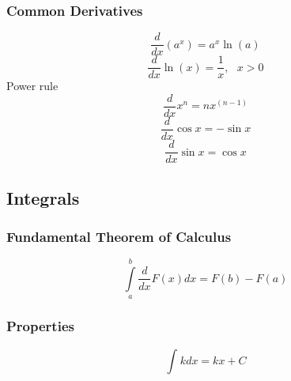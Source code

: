 \documentclass{article}
\begin{document}
		\subsubsection{Common Derivatives}
			\begin{equation}
				\frac{d}{{dx}}\left(a^x\right)=a^x\ln(a)
			\end{equation}      
			\begin{equation}
				\frac{d}{{dx}}\ln \left( x \right) = \frac{1}{x}, \ \ \ x > 0
			\end{equation}
			Power rule
			\begin{equation}
				\frac{d}{{dx}}x^n = nx^{\left( {n - 1} \right)}
	       \end{equation}
			\begin{equation}
				\frac{d}{{dx}}\cos x = -\sin x
			\end{equation}
			\begin{equation}
				\frac{d}{{dx}}\sin x = \cos x
			\end{equation}
	\subsection{Integrals}
		\subsubsection{Fundamental Theorem of Calculus}
			\begin{equation}
			\int\limits_a^b {\frac{d}{{dx}}F\left( x \right)dx} = F\left( b \right) - F\left( a \right)
			\end{equation}
		\subsubsection{Properties}
			\begin{equation}
				\int_{}^{}k dx = kx + C
			\end{equation}
\end{document}
